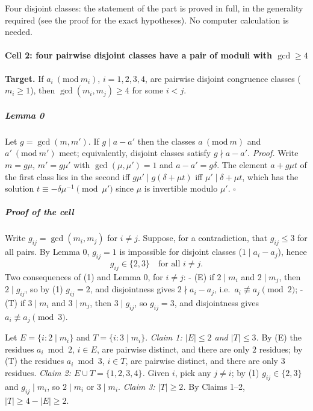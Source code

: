 
Four disjoint classes: the statement of the part is proved in full, in
the generality required (see the proof for the exact hypotheses). No
computer calculation is needed.


\paragraph{\texorpdfstring{Cell 2: four pairwise disjoint classes have a
pair of moduli with
\(\gcd\ge4\)}{Cell 2: four pairwise disjoint classes have a pair of moduli with \textbackslash gcd\textbackslash ge4}}\label{cell-2-four-pairwise-disjoint-classes-have-a-pair-of-moduli-with-gcdge4}

\textbf{Target.} If \(a_i\ (\mathrm{mod}\ m_i)\), \(i=1,2,3,4\), are
pairwise disjoint congruence classes (\(m_i\ge1\)), then
\(\gcd(m_i,m_j)\ge4\) for some \(i<j\).

\subparagraph{Lemma 0}\label{lemma-0}

Let \(g=\gcd(m,m')\). If \(g\mid a-a'\) then the classes
\(a\ (\mathrm{mod}\ m)\) and \(a'\ (\mathrm{mod}\ m')\) meet;
equivalently, disjoint classes satisfy \(g\nmid a-a'\). \emph{Proof.}
Write \(m=g\mu\), \(m'=g\mu'\) with \(\gcd(\mu,\mu')=1\) and
\(a-a'=g\delta\). The element \(a+g\mu t\) of the first class lies in
the second iff \(g\mu'\mid g(\delta+\mu t)\) iff
\(\mu'\mid\delta+\mu t\), which has the solution
\(t\equiv-\delta\mu^{-1}\pmod{\mu'}\) since \(\mu\) is invertible modulo
\(\mu'\). \(\square\)

\subparagraph{Proof of the cell}\label{proof-of-the-cell}

Write \(g_{ij}=\gcd(m_i,m_j)\) for \(i\ne j\). Suppose, for a
contradiction, that \(g_{ij}\le3\) for all pairs. By Lemma 0,
\(g_{ij}=1\) is impossible for disjoint classes (\(1\mid a_i-a_j\)),
hence \[g_{ij}\in\{2,3\}\quad\text{for all } i\ne j.\tag{1}\] Two
consequences of (1) and Lemma 0, for \(i\ne j\): - (E) if \(2\mid m_i\)
and \(2\mid m_j\), then \(2\mid g_{ij}\), so by (1) \(g_{ij}=2\), and
disjointness gives \(2\nmid a_i-a_j\), i.e.~\(a_i\not\equiv a_j\pmod2\);
- (T) if \(3\mid m_i\) and \(3\mid m_j\), then \(3\mid g_{ij}\), so
\(g_{ij}=3\), and disjointness gives \(a_i\not\equiv a_j\pmod3\).

Let \(E=\{i: 2\mid m_i\}\) and \(T=\{i:3\mid m_i\}\). \emph{Claim 1:
\(|E|\le2\) and \(|T|\le3\).} By (E) the residues \(a_i\bmod2\),
\(i\in E\), are pairwise distinct, and there are only \(2\) residues; by
(T) the residues \(a_i\bmod3\), \(i\in T\), are pairwise distinct, and
there are only \(3\) residues. \emph{Claim 2: \(E\cup T=\{1,2,3,4\}\).}
Given \(i\), pick any \(j\ne i\); by (1) \(g_{ij}\in\{2,3\}\) and
\(g_{ij}\mid m_i\), so \(2\mid m_i\) or \(3\mid m_i\). \emph{Claim 3:
\(|T|\ge2\).} By Claims 1--2, \(|T|\ge4-|E|\ge2\).

